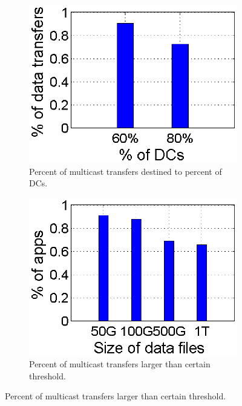 \begin{figure}[t]
        \centering
        \begin{subfigure}[b]{0.23\textwidth}
                \centering
                \includegraphics[width=\textwidth]{images/destinationDC.eps}%
                \caption{Percent of multicast transfers destined to percent of DCs.}
                \label{fig:bulk:dest}
        \end{subfigure}
	\hspace{0.1cm}
        \begin{subfigure}[b]{0.23\textwidth}
                \centering
                \includegraphics[width=\textwidth]{images/DataSize.eps}
                \caption{Percent of multicast transfers larger than certain threshold.}
                \label{fig:bulk:size}
        \end{subfigure}
        \vspace{-0.4cm}
        \label{fig:bulk}
\vspace{-0.4cm}
\end{figure}

